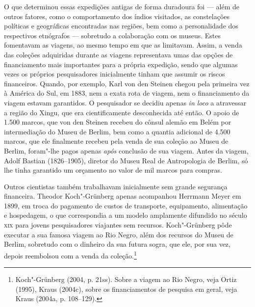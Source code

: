 O que determinou essas expedições antigas de forma duradoura foi --- além
de outros fatores, como o comportamento dos índios visitados, as
constelações políticas e geográficas encontradas nas regiões, bem como
a personalidade dos respectivos etnógrafos --- sobretudo a colaboração
com os museus. Estes fomentavam as viagens, ao mesmo tempo em que as
limitavam. Assim, a venda das coleções adquiridas durante as viagens
representava umas das opções de financiamento mais importantes para a
própria expedição, sendo que algumas vezes os próprios pesquisadores
inicialmente tinham que assumir os riscos financeiros. Quando, por
exemplo, Karl von den Steinen chegou pela primeira vez à América do Sul,
em 1883, nem a exata rota de viagem, nem o financiamento da viagem
estavam garantidos. O pesquisador se decidiu apenas \emph{in loco} a
atravessar a região do Xingu, que era cientificamente desconhecida até
então. O apoio de 1.500 marcos, que von den Steinen recebeu do cônsul
alemão em Belém por intermediação do Museu de Berlim, bem como a quantia
adicional de 4.500 marcos, que ele finalmente recebeu pela venda de sua
coleção ao Museu de Berlim, foram"-lhe pagos apenas \emph{após}
conclusão de sua viagem. Antes da viagem, Adolf Bastian (1826--1905),
diretor do Museu Real de Antropologia de Berlim, só lhe tinha garantido
um orçamento no valor de mil marcos para compras.

Outros cientistas também trabalhavam inicialmente sem grande segurança
financeira. Theodor Koch"-Grünberg apenas acompanhou Herrmann Meyer em
1899, em troca do pagamento de custos de transporte, equipamento,
alimentação e hospedagem, o que correspondia a um modelo amplamente
difundido no século \textsc{xix} para jovens pesquisadores viajantes sem
recursos. Koch"-Grünberg pôde executar a sua famosa viagem ao Rio Negro,
além dos recursos do Museu de Berlim, sobretudo com o dinheiro da sua
futura sogra, que ele, por sua vez, depois reembolsou com a venda da
coleção.\footnote{Koch"-Grünberg (2004, p. 21ss). Sobre a viagem ao Rio
  Negro, veja Ortiz (1995), Kraus (2004c), sobre os financiamentos de
  pesquisa em geral, veja Kraus (2004a, p. 108--129).}

